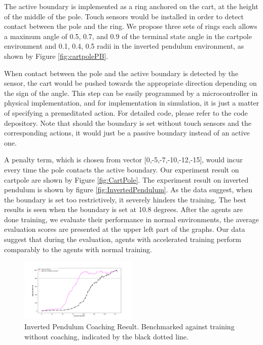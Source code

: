 \documentclass[journal]{IEEEtran}
\begin{document}
The active boundary is implemented as a ring anchored on the cart, at the height of the middle of the pole. Touch sensors would be installed in order to detect contact between the pole and the ring. We propose three sets of rings each allows a maximum angle of 0.5, 0.7, and 0.9 of the terminal state angle in the cartpole environment and 0.1, 0.4, 0.5 radii in the inverted pendulum environment, as shown by Figure \ref{fig:cartpolePB}. 

When contact between the pole and the active boundary is detected by the sensor, the cart would be pushed towards the appropriate direction depending on the sign of the angle. This step can be easily programmed by a microcontroller in physical implementation, and for implementation in simulation, it is just a matter of specifying a premeditated action. For detailed code, please refer to the code depository. Note that should the boundary is set without touch sensors and the corresponding actions, it would just be a passive boundary instead of an active one. 

A penalty term, which is chosen from vector [0,-5,-7,-10,-12,-15], would incur every time the pole contacts the active boundary. Our experiment result on cartpole are shown by Figure \ref{fig:CartPole}. The experiment result on inverted pendulum is shown by figure \ref{fig:InvertedPendulum}. As the data suggest, when the boundary is set too restrictively, it severely hinders the training. The best results is seen when the boundary is set at 10.8 degrees. After the agents are done training, we evaluate their performance in normal environments, the average evaluation scores are presented at the upper left part of the graphs. Our data suggest that during the evaluation, agents with accelerated training perform comparably to the agents with normal training.
\begin{figure}
     \centering
      \includegraphics[width=0.5\textwidth]{ip.png}
      \caption{Inverted Pendulum Coaching Result. Benchmarked against training without coaching, indicated by the black dotted line.}
      \label{fig:ip}
\end{figure}
\end{document}
